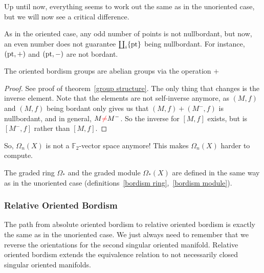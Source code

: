 \documentclass[a4paper,12pt]{article}
\begin{document}
Up until now, everything seems to work out the same as in the unoriented case, but we will now see a critical difference.

\begin{observation}
    As in the oriented case, any odd number of points is not nullbordant, but now, an even number does not guarantee \(\coprod_i\{\mathrm{pt}\}\) being nullbordant. For instance, \((\mathrm{pt},+)\) and \((\mathrm{pt},-)\) are not bordant.
\end{observation}

\begin{theorem}
    The oriented bordism groups are abelian groups via the operation \(+\)
\end{theorem}

\begin{proof}
    See proof of theorem\ \ref{group structure}. The only thing that changes is the inverse element. Note that the elements are not self-inverse anymore, as \((M,f)\) and \((M,f)\) being bordant only gives us that \((M,f)+(M^-,f)\) is nullbordant, and in general, \(M\textcolor{red}{\neq} M^-\). So the inverse for \([M,f]\) exists, but is \([M^-,f]\) rather than \([M,f]\).
\end{proof}

So, \(\Omega_n(X)\) is not a \(\mathbb{F}_2\)-vector space anymore! This makes \(\Omega_n(X)\) harder to compute.

The graded ring \(\Omega_\ast\) and the graded module \(\Omega_\ast(X)\) are defined in the same way as in the unoriented case (definitions\ \ref{bordism ring},\ \ref{bordism module}).


\subsubsection{Relative Oriented Bordism}

The path from absolute oriented bordism to relative oriented bordism is exactly the same as in the unoriented case. We just always need to remember that we reverse the orientations for the second singular oriented manifold. Relative oriented bordism extends the equivalence relation to not necessarily closed singular oriented manifolds.
\end{document}
